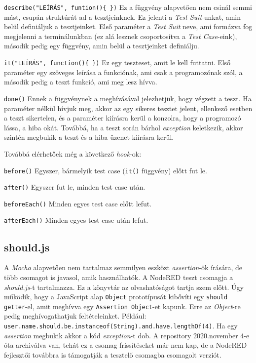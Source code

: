 \documentclass[
]{thesis-ekf}
\theoremstyle{definition}
\theoremstyle{remark}
\begin{document}
\texttt{describe("LEÍRÁS", funtion()\{ \})} Ez a függvény alapvetően nem csinál semmi mást, csupán struktúrát ad a tesztjeinknek. Ez jelenti a \emph{Test Suit}-unkat, amin belül definiáljuk a tesztjeinket. Első paraméter a \emph{Test Suit} neve, ami formázva fog megjelenni a terminálunkban (ez alá lesznek csoportosítva a \emph{Test Case}-eink), második pedig egy függvény, amin belül a tesztjeinket definiálju.

\texttt{it("LEÍRÁS", function()\{ \})} Ez egy teszteset, amit le kell futtatni. Első paraméter egy szöveges leírása a funkciónak, ami csak a programozónak szól, a második pedig a teszt funkció, ami meg lesz hívva.

\texttt{done()} Ennek a függvénynek a meghívásával jelezhetjük, hogy végzett a teszt. Ha paraméter nélkül hívjuk meg, akkor az egy sikeres tesztet jelent, ellenkező esetben a teszt sikertelen, és a paraméter kiírásra kerül a konzolra, hogy a programozó lássa, a hiba okát. Továbbá, ha a teszt során bárhol \emph{exception} keletkezik, akkor szintén megbukik a teszt és a hiba üzenet kiírásra kerül.

Továbbá elérhetőek még a következő \emph{hook}-ok:

\texttt{before()} Egyszer, bármelyik test case (\texttt{it()} függvény) előtt fut le.

\texttt{after()} Egyszer fut le, minden test case után.

\texttt{beforeEach()} Minden egyes test case előtt lefut.

\texttt{afterEach()} Minden egyes test case után lefut.

\subsection{should.js}
A \emph{Mocha} alapvetően nem tartalmaz semmilyen eszközt \emph{assertion}-ök írására, de több csomagot is javasol, amik használhatók. A NodeRED teszt csomagja a \emph{should.js}-t tartalmazza. Ez a könyvtár az olvashatóságot tartja szem előtt. Úgy működik, hogy a JavaScript alap \texttt{Object} prototípusát kibővíti egy \texttt{should} \texttt{getter}-el, amit meghívva egy \texttt{Assertion Object}-et kapunk. Erre az \emph{Object}-re pedig meghívogathatjuk feltételeinket. Például: \texttt{user.name.should.be.instanceof(String).and.have.lengthOf(4)}. Ha egy \emph{assertion} megbukik akkor a kód \emph{exception}-t dob. A repository 2020.november 4-e óta archiválva van, tehát ez a csomag frissítéseket már nem kap, de a NodeRED fejlesztői továbbra is támogatják a tesztelő csomagba csomagolt verziót. \cite{should-js}
\end{document}
